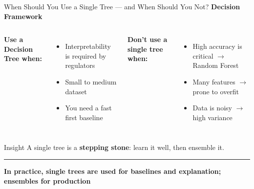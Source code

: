 \documentclass[8pt,aspectratio=169]{beamer}
\newcommand{\bottomnote}[1]{%
\vfill
\vspace{-2mm}
\textcolor{mllavender2}{\rule{\textwidth}{0.4pt}}
\vspace{1mm}
\footnotesize
\textbf{#1}
}
\newenvironment{compactlist}{%
  \begin{itemize}%
    \setlength{\itemsep}{2pt}%
    \setlength{\parskip}{0pt}%
    \setlength{\parsep}{0pt}%
}{%
  \end{itemize}%
}
\newcommand{\highlight}[1]{\textcolor{mlorange}{\textbf{#1}}}
\begin{document}
\begin{frame}[t]{When Should You Use a Single Tree --- and When Should You Not?}
\small
\textbf{Decision Framework}
\begin{columns}[T]
\textbf{\textcolor{mlgreen}{Use a Decision Tree when:}}
\begin{compactlist}
\item \footnotesize Interpretability is required by regulators
\item \footnotesize Small to medium dataset
\item \footnotesize You need a fast first baseline
\end{compactlist}

\textbf{\textcolor{dfred}{Don't use a single tree when:}}
\begin{compactlist}
\item \footnotesize High accuracy is critical $\to$ Random Forest
\item \footnotesize Many features $\to$ prone to overfit
\item \footnotesize Data is noisy $\to$ high variance
\end{compactlist}
\end{columns}
\vspace{2mm}
\begin{block}{Insight}
\footnotesize A single tree is a \highlight{stepping stone}: learn it well, then ensemble it.
\end{block}
\bottomnote{In practice, single trees are used for baselines and explanation; ensembles for production}
\end{frame}
\end{document}
